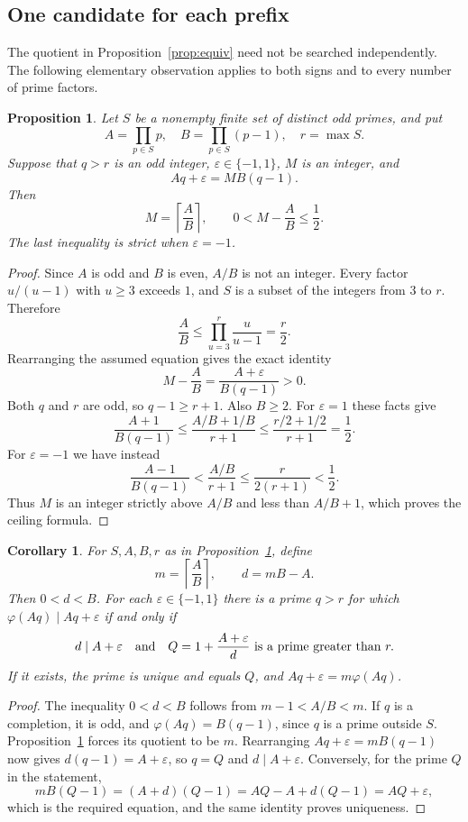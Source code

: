 \documentclass[screen,reqno]{aomart}
\numberwithin{equation}{section}
\theoremstyle{plain}
\newtheorem{proposition}[theorem]{Proposition}
\newtheorem{corollary}[theorem]{Corollary}
\theoremstyle{definition}
\theoremstyle{remark}
\begin{document}
\subsection{One candidate for each prefix}\label{sec:onecandidate}
The quotient in Proposition~\ref{prop:equiv} need not be searched
independently. The following elementary observation applies to both
signs and to every number of prime factors.

\begin{proposition}\label{prop:rounding}
Let $S$ be a nonempty finite set of distinct odd primes, and put
\[
 A=\prod_{p\in S}p,\quad B=\prod_{p\in S}(p-1),\quad r=\max S.
\]
Suppose that $q>r$ is an odd integer, $\varepsilon\in\{-1,1\}$,
$M$ is an integer, and
\[
 Aq+\varepsilon=MB(q-1).
\]
Then
\[
 M=\left\lceil\frac AB\right\rceil,\qquad
 0<M-\frac AB\le\frac12.
\]
The last inequality is strict when $\varepsilon=-1$.
\end{proposition}

\begin{proof}
Since $A$ is odd and $B$ is even, $A/B$ is not an integer.
Every factor $u/(u-1)$ with $u\ge3$ exceeds $1$, and $S$ is a subset
of the integers from $3$ to $r$. Therefore
\[
 \frac AB\le\prod_{u=3}^{r}\frac{u}{u-1}=\frac r2.
\]
Rearranging the assumed equation gives the exact identity
\[
 M-\frac AB=\frac{A+\varepsilon}{B(q-1)}>0.
\]
Both $q$ and $r$ are odd, so $q-1\ge r+1$. Also $B\ge2$.
For $\varepsilon=1$ these facts give
\[
 \frac{A+1}{B(q-1)}
 \le\frac{A/B+1/B}{r+1}
 \le\frac{r/2+1/2}{r+1}=\frac12.
\]
For $\varepsilon=-1$ we have instead
\[
 \frac{A-1}{B(q-1)}
 <\frac{A/B}{r+1}\le\frac{r}{2(r+1)}<\frac12.
\]
Thus $M$ is an integer strictly above $A/B$ and less than
$A/B+1$, which proves the ceiling formula.
\end{proof}

\begin{corollary}\label{cor:onecandidate}
For $S,A,B,r$ as in Proposition~\ref{prop:rounding}, define
\[
 m=\left\lceil\frac AB\right\rceil,\qquad d=mB-A.
\]
Then $0<d<B$. For each $\varepsilon\in\{-1,1\}$ there is a prime
$q>r$ for which $\varphi(Aq)\mid Aq+\varepsilon$ if and only if
\[
 d\mid A+\varepsilon
 \quad\hbox{and}\quad
 Q=1+\frac{A+\varepsilon}{d}\ \hbox{is a prime greater than }r.
\]
If it exists, the prime is unique and equals $Q$, and
$Aq+\varepsilon=m\varphi(Aq)$.
\end{corollary}

\begin{proof}
The inequality $0<d<B$ follows from $m-1<A/B<m$.
If $q$ is a completion, it is odd, and
$\varphi(Aq)=B(q-1)$, since $q$ is a prime outside $S$.
Proposition~\ref{prop:rounding} forces its quotient to be $m$.
Rearranging $Aq+\varepsilon=mB(q-1)$ now gives
$d(q-1)=A+\varepsilon$, so $q=Q$ and $d\mid A+\varepsilon$.
Conversely, for the prime $Q$ in the statement,
\[
 mB(Q-1)=(A+d)(Q-1)
           =AQ-A+d(Q-1)=AQ+\varepsilon,
\]
which is the required equation, and the same identity proves
uniqueness.
\end{proof}
\end{document}
